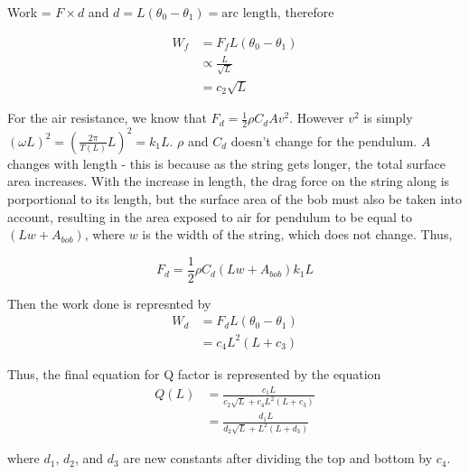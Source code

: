 \documentclass[main.tex]{subfiles}
\begin{document}
Work = $F\times d$ and $d = L(\theta_0 - \theta_1) = \text{arc length}$, therefore

\begin{align}
    W_f &= F_f L(\theta_0 - \theta_1) \\
    &\propto \frac{L}{\sqrt{L}} \\
    &= c_2\sqrt{L}
\end{align}

For the air resistance, we know that $F_d = \frac{1}{2}\rho C_d A v^2$. However $v^2$ is simply $(\omega L)^2 = \left(\frac{2\pi}{T(L)} L\right)^2 = k_1L$. $\rho$ and $C_d$ doesn't change for the pendulum. $A$ changes with length - this is because as the string gets longer, the total surface area increases. With the increase in length, the drag force on the string along is porportional to its length, but the surface area of the bob must also be taken into account, resulting in the area exposed to air for pendulum to be equal to $(Lw + A_{bob})$, where $w$ is the width of the string, which does not change. Thus,

\begin{equation}
    F_d = \frac{1}{2}\rho C_d (Lw + A_{bob}) k_1L
\end{equation}

Then the work done is represnted by
\begin{align*}
    W_d &= F_d L(\theta_0 - \theta_1) \\
    &= c_4L^2(L+c_3)
\end{align*}

Thus, the final equation for Q factor is represented by the equation
\begin{align}
    Q(L) &= \frac{c_1L}{c_2\sqrt{L} + c_4L^2(L+c_3)} \\
    &= \frac{d_1L}{d_2\sqrt{L} + L^2(L+d_3)}
\end{align}

where $d_1$, $d_2$, and $d_3$ are new constants after dividing the top and bottom by $c_4$.
\end{document}
